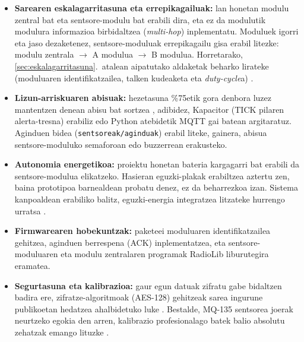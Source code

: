 \documentclass[10pt]{article}
\begin{document}
\begin{itemize}
    \item \textbf{Sarearen eskalagarritasuna eta errepikagailuak:} lan honetan modulu zentral bat eta sentsore-modulu bat erabili dira, eta ez da modulutik modulura informazioa birbidaltzea (\textit{multi-hop}) inplementatu. Moduluek igorri eta jaso dezaketenez, sentsore-moduluak errepikagailu gisa erabil litezke: modulu zentrala $\rightarrow$ A modulua $\rightarrow$ B modulua. Horretarako, \ref{sec:eskalagarritasuna}.~atalean aipatutako aldaketak beharko lirateke (moduluaren identifikatzailea, talken kudeaketa eta \textit{duty-cycle}a) \cite{bor2016}.
    
    \item \textbf{Lizun-arriskuaren abisuak:} hezetasuna \%75etik gora denbora luzez mantentzen denean abisu bat sortzea \cite{WHO2009}, adibidez, Kapacitor (TICK pilaren alerta-tresna) erabiliz edo Python atebidetik \ac{MQTT} gai batean argitaratuz. Aginduen bidea (\texttt{sentsoreak/aginduak}) erabil liteke, gainera, abisua sentsore-moduluko semaforoan edo buzzerrean erakusteko.

    \item \textbf{Autonomia energetikoa:} proiektu honetan bateria kargagarri bat erabili da sentsore-modulua elikatzeko. Hasieran eguzki-plakak erabiltzea aztertu zen, baina prototipoa barnealdean probatu denez, ez da beharrezkoa izan. Sistema kanpoaldean erabiliko balitz, eguzki-energia integratzea litzateke hurrengo urratsa \cite{wijeratne2025}.
    
    \item \textbf{Firmwarearen hobekuntzak:} paketeei moduluaren identifikatzailea gehitzea, aginduen berrespena (\acs{ACK}) inplementatzea, eta sentsore-moduluaren eta modulu zentralaren programak RadioLib liburutegira eramatea.

    \item \textbf{Segurtasuna eta kalibrazioa:} gaur egun datuak zifratu gabe bidaltzen badira ere, zifratze-algoritmoak (\acs{AES}-128) gehitzeak sarea ingurune publikoetan hedatzea ahalbidetuko luke \cite{daud2018securing}. Bestalde, MQ-135 sentsorea joerak neurtzeko egokia den arren, kalibrazio profesionalago batek balio absolutu zehatzak emango lituzke \cite{spinelle2015field,ali2021}.
\end{itemize}
\newpage

\shorthandoff*{~}

{\small}
\end{document}
